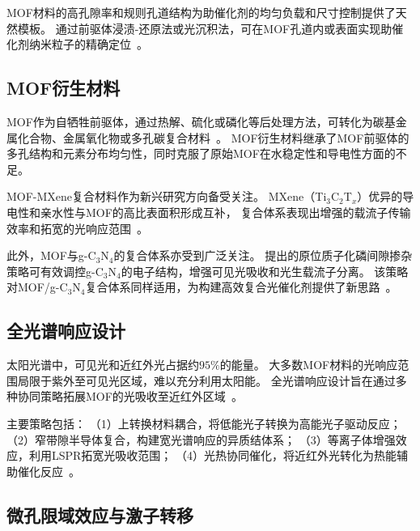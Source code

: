 MOF材料的高孔隙率和规则孔道结构为助催化剂的均匀负载和尺寸控制提供了天然模板。
通过前驱体浸渍-还原法或光沉积法，可在MOF孔道内或表面实现助催化剂纳米粒子的精确定位~\citep{hassan2024emerging_trends}。 %


\subsection{MOF衍生材料}

MOF作为自牺牲前驱体，通过热解、硫化或磷化等后处理方法，可转化为碳基金属化合物、金属氧化物或多孔碳复合材料~\citep{singh2025mini_review}。 %
MOF衍生材料继承了MOF前驱体的多孔结构和元素分布均匀性，同时克服了原始MOF在水稳定性和导电性方面的不足。

MOF-MXene复合材料作为新兴研究方向备受关注。
MXene（Ti$_3$C$_2$T$_x$）优异的导电性和亲水性与MOF的高比表面积形成互补，
复合体系表现出增强的载流子传输效率和拓宽的光响应范围~\citep{mxene_mof_2024}。 %

此外，MOF与g-C$_3$N$_4$的复合体系亦受到广泛关注。
\citet{wang2023p_doped_cn}提出的原位质子化磷间隙掺杂策略可有效调控g-C$_3$N$_4$的电子结构，增强可见光吸收和光生载流子分离。 %
该策略对MOF/g-C$_3$N$_4$复合体系同样适用，为构建高效复合光催化剂提供了新思路~\citep{wang2023p_doped_cn}。 %


\subsection{全光谱响应设计}

太阳光谱中，可见光和近红外光占据约$95\%$的能量。
大多数MOF材料的光响应范围局限于紫外至可见光区域，难以充分利用太阳能。
全光谱响应设计旨在通过多种协同策略拓展MOF的光吸收至近红外区域~\citep{mof_fullspectrum_2025}。 %

主要策略包括：
（1）上转换材料耦合，将低能光子转换为高能光子驱动反应；
（2）窄带隙半导体复合，构建宽光谱响应的异质结体系；
（3）等离子体增强效应，利用LSPR拓宽光吸收范围；
（4）光热协同催化，将近红外光转化为热能辅助催化反应~\citep{mof_fullspectrum_2025}。 %


\subsection{微孔限域效应与激子转移}

